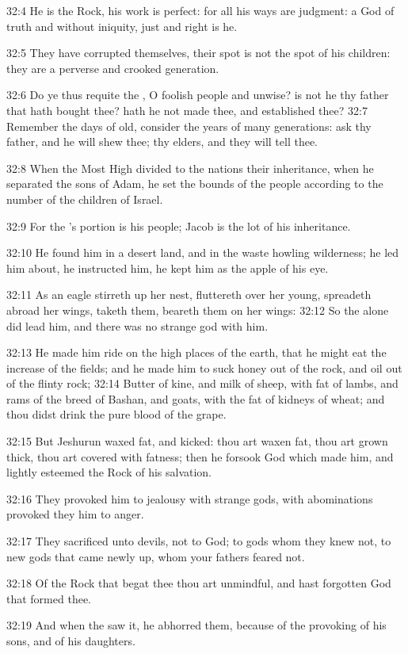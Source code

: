 32:4 He is the Rock, his work is perfect: for all his ways are judgment: a God of truth and without iniquity, just and right is he.

32:5 They have corrupted themselves, their spot is not the spot of his children: they are a perverse and crooked generation.

32:6 Do ye thus requite the \LORD, O foolish people and unwise? is not he thy father that hath bought thee? hath he not made thee, and established thee?  32:7 Remember the days of old, consider the years of many generations: ask thy father, and he will shew thee; thy elders, and they will tell thee.

32:8 When the Most High divided to the nations their inheritance, when he separated the sons of Adam, he set the bounds of the people according to the number of the children of Israel.

32:9 For the \LORD's portion is his people; Jacob is the lot of his inheritance.

32:10 He found him in a desert land, and in the waste howling wilderness; he led him about, he instructed him, he kept him as the apple of his eye.

32:11 As an eagle stirreth up her nest, fluttereth over her young, spreadeth abroad her wings, taketh them, beareth them on her wings: 32:12 So the \LORD alone did lead him, and there was no strange god with him.

32:13 He made him ride on the high places of the earth, that he might eat the increase of the fields; and he made him to suck honey out of the rock, and oil out of the flinty rock; 32:14 Butter of kine, and milk of sheep, with fat of lambs, and rams of the breed of Bashan, and goats, with the fat of kidneys of wheat; and thou didst drink the pure blood of the grape.

32:15 But Jeshurun waxed fat, and kicked: thou art waxen fat, thou art grown thick, thou art covered with fatness; then he forsook God which made him, and lightly esteemed the Rock of his salvation.

32:16 They provoked him to jealousy with strange gods, with abominations provoked they him to anger.

32:17 They sacrificed unto devils, not to God; to gods whom they knew not, to new gods that came newly up, whom your fathers feared not.

32:18 Of the Rock that begat thee thou art unmindful, and hast forgotten God that formed thee.

32:19 And when the \LORD saw it, he abhorred them, because of the provoking of his sons, and of his daughters.

